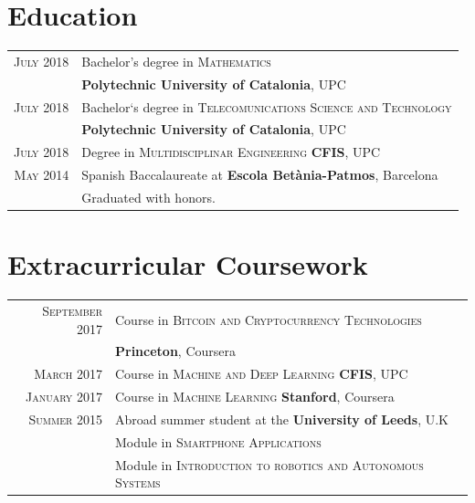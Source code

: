 \documentclass[a4paper,10pt]{article} %
\begin{document}
\section{Education}

\begin{tabular}{rl}	
\textsc{July} 2018 & Bachelor's degree in \textsc{Mathematics} \\ & \textbf{Polytechnic University of Catalonia}, UPC\\


\textsc{July} 2018 &  Bachelor`s degree in \textsc{Telecomunications Science and Technology}\\ & \textbf{Polytechnic University of Catalonia}, UPC\\

\textsc{July} 2018 &  Degree in \textsc{Multidisciplinar Engineering} \textbf{CFIS}, UPC\\


\textsc{May} 2014 & Spanish Baccalaureate at \textbf{Escola Betània-Patmos}, Barcelona \\ &  Graduated with honors. \\
\end{tabular}



\section{Extracurricular Coursework}
\begin{tabular}{rl}	
\textsc{September} 2017 &  Course in \textsc{Bitcoin and Cryptocurrency Technologies} \\
 & \textbf{Princeton}, Coursera\\

\textsc{March} 2017 &  Course in \textsc{Machine and Deep Learning} \textbf{CFIS}, UPC\\

\textsc{January} 2017 &  Course in \textsc{Machine Learning} \textbf{Stanford}, Coursera\\


\textsc{Summer} 2015 & Abroad summer student at the \textbf{University of Leeds}, U.K\\
& Module in \textsc{Smartphone Applications}\\ & Module in \textsc{Introduction to robotics and Autonomous Systems}\\
\end{tabular}
\vspace{-5pt}
\end{document}
